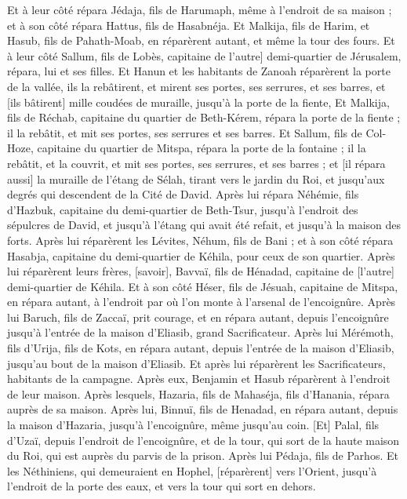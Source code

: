 \begin{multicols}{2}
Et à leur côté répara Jédaja, fils de Harumaph, même à l'endroit de sa maison ; et à son côté répara Hattus, fils de Hasabnéja.
Et Malkija, fils de Harim, et Hasub, fils de Pahath-Moab, en réparèrent autant, et même la tour des fours.
Et à leur côté Sallum, fils de Lobès, capitaine de {l'autre] demi-quartier de Jérusalem, répara, lui et ses filles.
Et Hanun et les habitants de Zanoah réparèrent la porte de la vallée, ils la rebâtirent, et mirent ses portes, ses serrures, et ses barres, et [ils bâtirent] mille coudées de muraille, jusqu'à la porte de la fiente,
Et Malkija, fils de Réchab, capitaine du quartier de Beth-Kérem, répara la porte de la fiente ; il la rebâtit, et mit ses portes, ses serrures et ses barres.
Et Sallum, fils de Col-Hoze, capitaine du quartier de Mitspa, répara la porte de la fontaine ; il la rebâtit, et la couvrit, et mit ses portes, ses serrures, et ses barres ; et [il répara aussi] la muraille de l'étang de Sélah, tirant vers le jardin du Roi, et jusqu'aux degrés qui descendent de la Cité de David.
Après lui répara Néhémie, fils d'Hazbuk, capitaine du demi-quartier de Beth-Tsur, jusqu'à l'endroit des sépulcres de David, et jusqu'à l'étang qui avait été refait, et jusqu'à la maison des forts.
Après lui réparèrent les Lévites, Néhum, fils de Bani ; et à son côté répara Hasabja, capitaine du demi-quartier de Kéhila, pour ceux de son quartier.
Après lui réparèrent leurs frères, [savoir], Bavvaï, fils de Hénadad, capitaine de [l'autre] demi-quartier de Kéhila.
Et à son côté Héser, fils de Jésuah, capitaine de Mitspa, en répara autant, à l'endroit par où l'on monte à l'arsenal de l'encoignûre.
Après lui Baruch, fils de Zaccaï, prit courage, et en répara autant, depuis l'encoignûre jusqu'à l'entrée de la maison d'Eliasib, grand Sacrificateur.
Après lui Mérémoth, fils d'Urija, fils de Kots, en répara autant, depuis l'entrée de la maison d'Eliasib, jusqu'au bout de la maison d'Eliasib.
Et après lui réparèrent les Sacrificateurs, habitants de la campagne.
Après eux, Benjamin et Hasub réparèrent à l'endroit de leur maison. Après lesquels, Hazaria, fils de Mahaséja, fils d'Hanania, répara auprès de sa maison.
Après lui, Binnuï, fils de Henadad, en répara autant, depuis la maison d'Hazaria, jusqu'à l'encoignûre, même jusqu'au coin.
[Et] Palal, fils d'Uzaï, depuis l'endroit de l'encoignûre, et de la tour, qui sort de la haute maison du Roi, qui est auprès du parvis de la prison. Après lui Pédaja, fils de Parhos.
Et les Néthiniens, qui demeuraient en Hophel, [réparèrent] vers l'Orient, jusqu'à l'endroit de la porte des eaux, et vers la tour qui sort en dehors.
}
\end{multicols}
